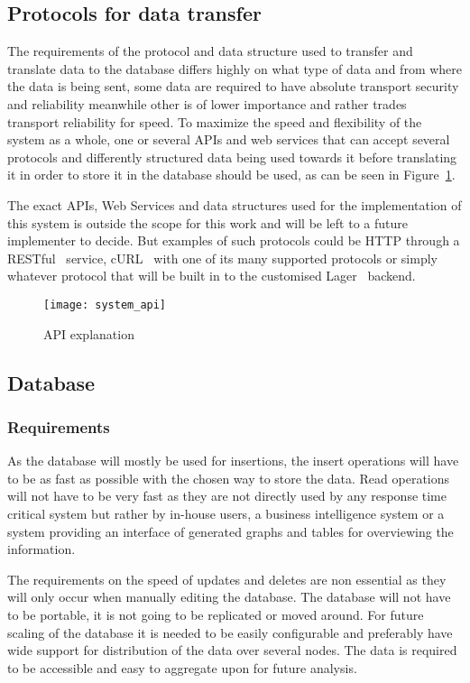 \documentclass[a4paper,12pt]{article}
\begin{document}
\newpage
\subsection{Protocols for data transfer}
The requirements of the protocol and data structure used to transfer and translate data to the database differs highly on what type of data and from where the data is being sent, some data are required to have 
absolute transport security and reliability meanwhile other is of lower importance and rather trades transport reliability for speed. To maximize the speed and flexibility of the system as a whole, 
one or several APIs and web services that can accept several protocols and differently structured data being used towards it before translating it in order to store it in the database should be used, as can be seen in 
Figure~\ref{fig:api}.

The exact APIs, Web Services and data structures used for the implementation of this system is outside the scope for this work and will be left to a future implementer to decide. But examples of such protocols 
could be HTTP through a RESTful~\cite{REST} service, cURL~\cite{CURL} with one of its many supported protocols or simply whatever protocol that will be built in to the customised Lager~\cite{LAGER} backend.

\begin{figure}[h!]
    \vspace{0.25in}
    \centerline{\texttt{[image: system\_api]}}
    \caption{API explanation}
    \label{fig:api}
\end{figure}

\subsection{Database}
\subsubsection{Requirements}
\label{REQUIREMENTS}
As the database will mostly be used for insertions, the insert operations will have to be as fast as possible with the chosen way to store the data. 
Read operations will not have to be very fast as they are not directly used by any response time critical system but rather by in-house users, a business intelligence system or a system providing an interface of generated 
graphs and tables for overviewing the information. 

The requirements on the speed of updates and deletes are non essential as they will only occur when manually editing the database. 
The database will not have to be portable, it is not going to be replicated or moved around. 
For future scaling of the database it is needed to be easily configurable and preferably have wide support for distribution of the data over several nodes. 
The data is required to be accessible and easy to aggregate upon for future analysis.
\end{document}
